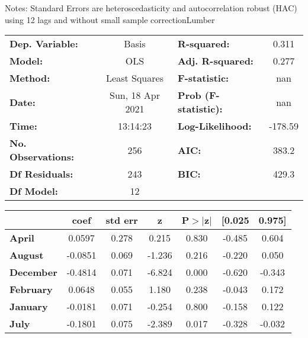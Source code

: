 Notes: \newline
 [1] Standard Errors are heteroscedasticity and autocorrelation robust (HAC) using 12 lags and without small sample correctionLumber\begin{center}
\begin{tabular}{lclc}
\toprule
\textbf{Dep. Variable:}    &      Basis       & \textbf{  R-squared:         } &     0.311   \\
\textbf{Model:}            &       OLS        & \textbf{  Adj. R-squared:    } &     0.277   \\
\textbf{Method:}           &  Least Squares   & \textbf{  F-statistic:       } &       nan   \\
\textbf{Date:}             & Sun, 18 Apr 2021 & \textbf{  Prob (F-statistic):} &      nan    \\
\textbf{Time:}             &     13:14:23     & \textbf{  Log-Likelihood:    } &   -178.59   \\
\textbf{No. Observations:} &         256      & \textbf{  AIC:               } &     383.2   \\
\textbf{Df Residuals:}     &         243      & \textbf{  BIC:               } &     429.3   \\
\textbf{Df Model:}         &          12      & \textbf{                     } &             \\
\bottomrule
\end{tabular}
\begin{tabular}{lcccccc}
                   & \textbf{coef} & \textbf{std err} & \textbf{z} & \textbf{P$> |$z$|$} & \textbf{[0.025} & \textbf{0.975]}  \\
\midrule
\textbf{April}     &       0.0597  &        0.278     &     0.215  &         0.830        &       -0.485    &        0.604     \\
\textbf{August}    &      -0.0851  &        0.069     &    -1.236  &         0.216        &       -0.220    &        0.050     \\
\textbf{December}  &      -0.4814  &        0.071     &    -6.824  &         0.000        &       -0.620    &       -0.343     \\
\textbf{February}  &       0.0648  &        0.055     &     1.180  &         0.238        &       -0.043    &        0.172     \\
\textbf{January}   &      -0.0181  &        0.071     &    -0.254  &         0.800        &       -0.158    &        0.122     \\
\textbf{July}      &      -0.1801  &        0.075     &    -2.389  &         0.017        &       -0.328    &       -0.032     \\

\end{tabular}
\end{center}
